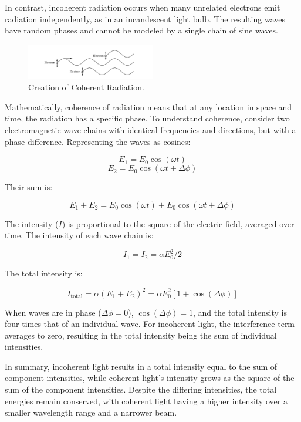 In contrast, incoherent radiation occurs when many unrelated electrons emit radiation independently, as in an incandescent light bulb. The resulting waves have random phases and cannot be modeled by a single chain of sine waves.

\begin{figure}[H]
	\centering
	\includegraphics[width=0.5\textwidth]{Images/coherent_radiation.png}
	\caption{Creation of Coherent Radiation.}
	\label{fig:coherent_radiation}
\end{figure}

Mathematically, coherence of radiation means that at any location in space and time, the radiation has a specific phase. To understand coherence, consider two electromagnetic wave chains with identical frequencies and directions, but with a phase difference. Representing the waves as cosines:

\[
E_1 = E_0 \cos(\omega t)
\]
\[
E_2 = E_0 \cos(\omega t + \Delta \phi)
\]

Their sum is:

\[
E_1 + E_2 = E_0 \cos(\omega t) + E_0 \cos(\omega t + \Delta \phi)
\]

The intensity (\( I \)) is proportional to the square of the electric field, averaged over time. The intensity of each wave chain is:

\[
I_1 = I_2 = \alpha E_0^2 / 2
\]

The total intensity is:

\[
I_{\text{total}} = \alpha (E_1 + E_2)^2 = \alpha E_0^2 \left[1 + \cos(\Delta \phi)\right]
\]

When waves are in phase (\( \Delta \phi = 0 \)), \( \cos(\Delta \phi) = 1 \), and the total intensity is four times that of an individual wave. For incoherent light, the interference term averages to zero, resulting in the total intensity being the sum of individual intensities.

In summary, incoherent light results in a total intensity equal to the sum of component intensities, while coherent light's intensity grows as the square of the sum of the component intensities. Despite the differing intensities, the total energies remain conserved, with coherent light having a higher intensity over a smaller wavelength range and a narrower beam.


